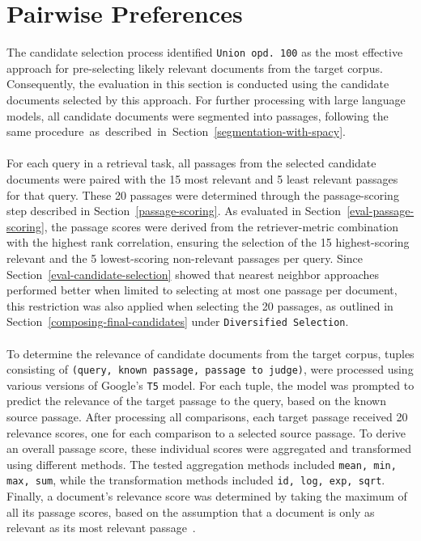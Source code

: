 \section{Pairwise Preferences}\label{eval-pairwise-preferences}

The candidate selection process identified \mbox{\texttt{Union opd.\ 100}} as the most effective approach for pre-selecting likely relevant documents from the target corpus. Consequently, the evaluation in this section is conducted using the candidate documents selected by this approach. For further processing with large language models, all candidate documents were segmented into passages, following the same \mbox{procedure as described in Section~\ref{segmentation-with-spacy}.}
\\\\
For each query in a retrieval task, all passages from the selected candidate documents were paired with the 15 most relevant and 5 least relevant passages for that query. These 20 passages were determined through the passage-scoring step described in Section~\ref{passage-scoring}. As evaluated in Section~\ref{eval-passage-scoring}, the passage scores were derived from the retriever-metric combination with the highest rank correlation, ensuring the selection of the 15 highest-scoring relevant and the 5 lowest-scoring non-relevant passages per query. Since Section~\ref{eval-candidate-selection} showed that nearest neighbor approaches performed better when limited to selecting at most one passage per document, this restriction was also applied when selecting the 20 passages, as outlined in Section~\ref{composing-final-candidates} under \texttt{Diversified Selection}.
\\\\
To determine the relevance of candidate documents from the target corpus, tuples consisting of \texttt{(query, known passage, passage to judge)}, were processed using various versions of Google's \texttt{T5} model. For each tuple, the model was prompted to predict the relevance of the target passage to the query, based on the known source passage. After processing all comparisons, each  \linebreak target passage received 20 relevance scores, one for each comparison \linebreak to a selected source passage. To derive an overall passage score, these individual scores were aggregated and transformed using different methods. \linebreak  The tested aggregation methods included \texttt{mean, min, max, sum}, while the transformation methods included \texttt{id, log, exp, sqrt}. Finally, a document's relevance score was determined by taking the maximum of all its passage scores, based on the assumption that a document is only as relevant as its most relevant passage~\citep{craswell:2019}.
